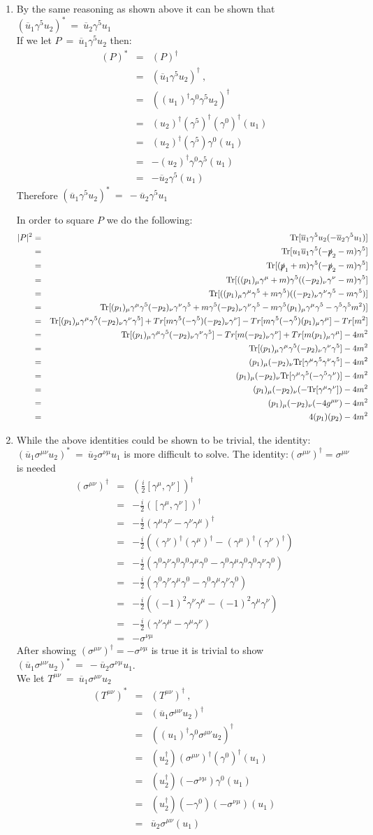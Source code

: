 \documentclass[12pt]{article}
\def \bea{\begin{eqnarray}}
\def \eea{\end{eqnarray}}
\def \Tr{{\rm Tr}}
\def \nn{\nonumber}
\def \nl{\nn \\}
\def \ou{\overline{u}}
\def \ga{\gamma}
\def \si{\sigma}
\begin{document}
\begin{enumerate}
\item  By the same reasoning as shown above it can be shown that $(\ou_1 \ga^5 u_2)^* ~=~ \ou_2 \ga^5 u_1$ \\
If we let $P ~=~ \ou_1\ga^5 u_2$ then:
\bea
(P)^* &=& (P)^\dag \\
&=& (\ou_1\ga^5 u_2)^\dag ~,~~ \nl
&=& ((u_1)^\dag\ga^0\ga^5 u_2)^\dag \nl
&=& (u_2)^\dag(\ga^5)^\dag (\ga^0)^\dag(u_1)\nl
&=& (u_2)^\dag(\ga^5) \ga^0(u_1)\nl
&=& -(u_2)^\dag \ga^0\ga^5(u_1)\nl
&=& -\ou_2\ga^5(u_1)
\eea
Therefore  $(\ou_1 \ga^5 u_2)^* ~=~ -\ou_2 \ga^5 u_1$

In order to square $P$ we do the following:
\bea
|P|^2&=& \Tr[\ou_1 \ga^5 u_2(-\ou_2 \ga^5 u_1)] \\
&=& \Tr[u_1 \ou_1 \ga^5(-\slashed{p}_2 - m) \ga^5] \nl
&=& \Tr[(\slashed{p}_1+m) \ga^5 (-\slashed{p}_2-m) \ga^5] \nl
&=& \Tr[((p_1)_\mu \ga^\mu+m) \ga^5 ((-p_2)_\nu\ga^\nu-m)  \ga^5] \nl
&=& \Tr[((p_1)_\mu \ga^\mu\ga^5+m\ga^5) ((-p_2)_\nu\ga^\nu\ga^5-m\ga^5)] \nl
&=& \Tr[(p_1)_\mu \ga^\mu\ga^5(-p_2)_\nu\ga^\nu\ga^5+ m\ga^5(-p_2)_\nu\ga^\nu\ga^5 -m\ga^5(p_1)_\mu \ga^\mu\ga^5 - \ga^5\ga^5m^2)] \nl
&=& \Tr[(p_1)_\mu \ga^\mu\ga^5(-p_2)_\nu\ga^\nu\ga^5] + Tr[ m\ga^5(-\ga^5)(-p_2)_\nu\ga^\nu] - Tr[m\ga^5(-\ga^5)(p_1)_\mu \ga^\mu] - Tr[m^2] \nl
&=& \Tr[(p_1)_\mu \ga^\mu\ga^5(-p_2)_\nu\ga^\nu\ga^5] -Tr[ m(-p_2)_\nu\ga^\nu] + Tr[m(p_1)_\mu \ga^\mu] - 4m^2 \nl
&=& \Tr[(p_1)_\mu \ga^\mu\ga^5(-p_2)_\nu\ga^\nu\ga^5] - 4m^2 \nl
&=& (p_1)_\mu(-p_2)_\nu \Tr[\ga^\mu\ga^5\ga^\nu\ga^5]- 4m^2 \nl
&=& (p_1)_\mu(-p_2)_\nu \Tr[\ga^\mu\ga^5(-\ga^5\ga^\nu)]- 4m^2\nl
&=& (p_1)_\mu(-p_2)_\nu (-\Tr[\ga^\mu\ga^\nu])- 4m^2\nl
&=& (p_1)_\mu(-p_2)_\nu (-4g^{\mu\nu})- 4m^2\nl
&=& 4(p_1)(p_2)- 4m^2
\eea
\item  While the above identities could be shown to be trivial, the identity: $(\ou_1 \si^{\mu\nu} u_2)^* ~=~\ou_2 \si^{\nu\mu} u_1$ is more difficult to solve. The identity:$(\si^{\mu\nu})^\dag =\si^{\mu\nu}$ is needed
\bea
(\si^{\mu\nu})^\dag &=& (\frac{i}{2}[\ga^\mu,\ga^\nu])^\dag \\
&=& -\frac{i}{2}([\ga^\mu,\ga^\nu])^\dag\nl
&=& -\frac{i}{2}(\ga^\mu\ga^\nu-\ga^\nu\ga^\mu)^\dag \nl
&=& -\frac{i}{2}((\ga^\nu)^\dag(\ga^\mu)^\dag-(\ga^\mu)^\dag(\ga^\nu)^\dag) \nl
&=& -\frac{i}{2}(\ga^0\ga^\nu\ga^0\ga^0\ga^\mu\ga^0-\ga^0\ga^\mu\ga^0\ga^0\ga^\nu\ga^0)\nl
&=& -\frac{i}{2}(\ga^0\ga^\nu\ga^\mu\ga^0-\ga^0\ga^\mu \ga^\nu\ga^0)\nl
&=& -\frac{i}{2}((-1)^2\ga^\nu\ga^\mu-(-1)^2\ga^\mu \ga^\nu) \nl
&=& -\frac{i}{2}(\ga^\nu\ga^\mu-\ga^\mu \ga^\nu)\nl
&=& -\si^{\nu\mu}
\eea
After showing $(\si^{\mu\nu})^\dag =-\si^{\nu\mu}$ is true it is trivial to show $(\ou_1 \si^{\mu\nu} u_2)^* ~=~ -\ou_2 \si^{\nu\mu} u_1$.\\
We let $T^{\mu\nu} ~=~ \ou_1 \si^{\mu\nu} u_2$
\bea
(T^{\mu\nu})^* &=& (T^{\mu\nu})^\dag ~,~~ \\
&=& (\ou_1 \si^{\mu\nu} u_2)^\dag \nl
&=& ((u_1)^\dag \ga^0 \si^{\mu\nu} u_2)^\dag \nl
&=& (u_2^\dag)(\si^{\mu\nu})^\dag (\ga^0)^\dag(u_1)\nl
&=& (u_2^\dag)(-\si^{\nu\mu})\ga^0(u_1)\nl
&=& (u_2^\dag)(-\ga^0)(-\si^{\nu\mu})(u_1)\nl
&=& \ou_2 \si^{\mu\nu}(u_1)
\eea


\end{enumerate}
\end{document}
